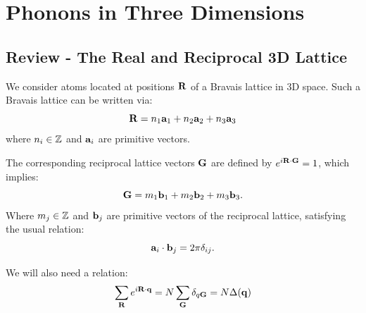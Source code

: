 \section{Phonons in Three Dimensions}
\subsection{Review - The Real and Reciprocal 3D Lattice}
We consider atoms located at positions $\mathbf{R}$ of a Bravais lattice in 3D space. Such a Bravais lattice can be written via:
\begin{equation}
    \mathbf{R} = n_1\mathbf{a}_1 + n_2\mathbf{a}_2 + n_3\mathbf{a}_3
\end{equation}
where $n_i \in \mathbb{Z}$ and $\mathbf{a}_i$ are primitive vectors.

The corresponding reciprocal lattice vectors $\mathbf{G}$ are defined by $e^{i\mathbf{R} \cdot \mathbf{G}} = 1$, which implies:
\begin{equation}
    \mathbf{G} = m_1 \mathbf{b}_1 + m_2\mathbf{b}_2 + m_3\mathbf{b}_3.
\end{equation}
Where $m_j \in \mathbb{Z}$ and $\mathbf{b}_j$ are primitive vectors of the reciprocal lattice, satisfying the usual relation:
\begin{equation}
    \mathbf{a}_i \cdot \mathbf{b}_j = 2\pi \delta_{ij}.
\end{equation}

We will also need a relation:
\begin{equation}
    \sum_{\mathbf{R}}e^{i\mathbf{R} \cdot \mathbf{q}} = N\sum_{\mathbf{G}}\delta_{q\mathbf{G}} = N\Delta (\mathbf{q})
\end{equation}

